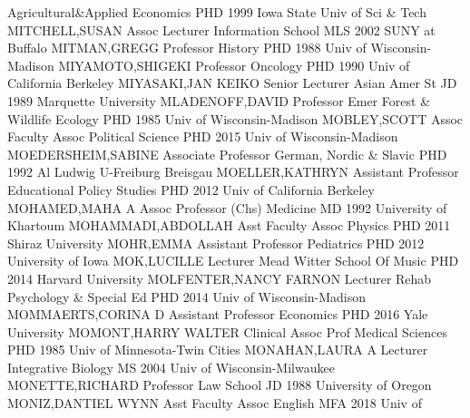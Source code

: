 \documentclass[
]{article}
\begin{document}
\textbar Agricultural\&Applied Economics \textbar{} 
\textbar PHD 1999 Iowa State Univ of Sci \& Tech \textbar MITCHELL,SUSAN
\textbar Assoc Lecturer \textbar Information School \textbar{}
 \textbar MLS 2002 SUNY at Buffalo \textbar MITMAN,GREGG
\textbar Professor \textbar History \textbar{}  \textbar PHD
1988 Univ of Wisconsin-Madison \textbar MIYAMOTO,SHIGEKI
\textbar Professor \textbar Oncology \textbar{} 
\textbar PHD 1990 Univ of California Berkeley \textbar MIYASAKI,JAN
KEIKO \textbar Senior Lecturer \textbar Asian Amer St \textbar{}
 \textbar JD 1989 Marquette University
\textbar MLADENOFF,DAVID \textbar Professor Emer \textbar Forest \&
Wildlife Ecology \textbar{}  \textbar PHD 1985 Univ of
Wisconsin-Madison \textbar MOBLEY,SCOTT \textbar Assoc Faculty Assoc
\textbar Political Science \textbar{}  \textbar PHD 2015
Univ of Wisconsin-Madison \textbar MOEDERSHEIM,SABINE \textbar Associate
Professor \textbar German, Nordic \& Slavic \textbar{} 
\textbar PHD 1992 Al Ludwig U-Freiburg Breisgau \textbar MOELLER,KATHRYN
\textbar Assistant Professor \textbar Educational Policy Studies
\textbar{}  \textbar PHD 2012 Univ of California Berkeley
\textbar MOHAMED,MAHA A \textbar Assoc Professor (Chs) \textbar Medicine
\textbar{}  \textbar MD 1992 University of Khartoum
\textbar MOHAMMADI,ABDOLLAH \textbar Asst Faculty Assoc \textbar Physics
\textbar{}  \textbar PHD 2011 Shiraz University
\textbar MOHR,EMMA \textbar Assistant Professor \textbar Pediatrics
\textbar{}  \textbar PHD 2012 University of Iowa
\textbar MOK,LUCILLE \textbar Lecturer \textbar Mead Witter School Of
Music \textbar{}  \textbar PHD 2014 Harvard University
\textbar MOLFENTER,NANCY FARNON \textbar Lecturer \textbar Rehab
Psychology \& Special Ed \textbar{}  \textbar PHD 2014 Univ
of Wisconsin-Madison \textbar MOMMAERTS,CORINA D \textbar Assistant
Professor \textbar Economics \textbar{}  \textbar PHD 2016
Yale University \textbar MOMONT,HARRY WALTER \textbar Clinical Assoc
Prof \textbar Medical Sciences \textbar{}  \textbar PHD 1985
Univ of Minnesota-Twin Cities \textbar MONAHAN,LAURA A \textbar Lecturer
\textbar Integrative Biology \textbar{}  \textbar MS 2004
Univ of Wisconsin-Milwaukee \textbar MONETTE,RICHARD \textbar Professor
\textbar Law School \textbar{}  \textbar JD 1988 University
of Oregon \textbar MONIZ,DANTIEL WYNN \textbar Asst Faculty Assoc
\textbar English \textbar{}  \textbar MFA 2018 Univ of
\end{document}

